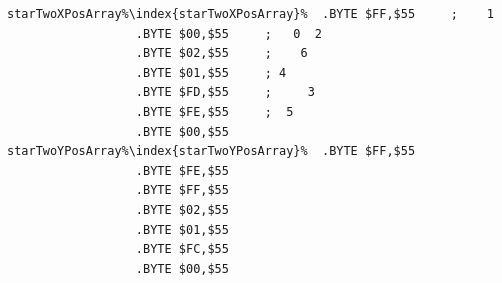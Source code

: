 \begin{minipage}[b]{0.48\linewidth}
\begin{lrbox}{\mybox}%
\begin{lstlisting}[basicstyle=\ttfamily\tiny,escapechar=\%]
starTwoXPosArray%\index{starTwoXPosArray}%  .BYTE $FF,$55     ;    1  
                  .BYTE $00,$55     ;   0  2
                  .BYTE $02,$55     ;    6  
                  .BYTE $01,$55     ; 4     
                  .BYTE $FD,$55     ;     3 
                  .BYTE $FE,$55     ;  5    
                  .BYTE $00,$55
starTwoYPosArray%\index{starTwoYPosArray}%  .BYTE $FF,$55
                  .BYTE $FE,$55
                  .BYTE $FF,$55
                  .BYTE $02,$55
                  .BYTE $01,$55
                  .BYTE $FC,$55
                  .BYTE $00,$55
\end{lstlisting}
\end{lrbox}%
\scalebox{0.8}{\usebox{\mybox}}

\end{minipage}
